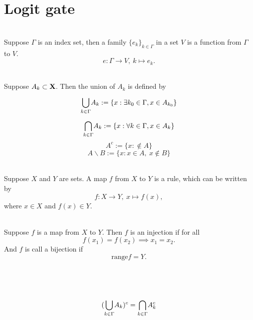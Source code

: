\documentclass[12pt]{book}
\begin{document}
\section{Logit gate}


\begin{definition}[Family] \ \\
Suppose $\Gamma$ is an index set, then a family $\{e_k\}_{k\in \Gamma}$ in a set $V$ is a function from $\Gamma$ to $V$.
$$
e : \Gamma \to V,\ k\mapsto e_k.
$$
\end{definition}

\begin{definition} \ \\
 Suppose $A_k \subset \mathbf{X}$. Then the union of $A_k$ is defined by 
 $$
 {\bigcup_{k\in\Gamma}^{}} A_k := \{ x: \exists k_0 \in \Gamma, x\in A_{k_0}\}
 $$
 $$
 {\bigcap_{k\in\Gamma}^{}} A_k := \{ x: \forall k \in \Gamma, x\in A_{k}\}
 $$
 $$
 A^c := \{x: \notin A\}
 $$
 $$
 A \backslash B := \{x: x\in A,\ x \notin B \}
 $$
\end{definition}

\begin{definition}[Map] \ \\
Suppose $X$ and $Y$ are sets. A map $f$ from $X$ to $Y$ is a rule, which can be written by
$$
f: X \to Y,\ x \mapsto f(x),
$$
where $x \in X$ and $f(x) \in Y$.
\end{definition}

\begin{definition} \ \\
Suppose $f$ is a map from $X$ to $Y$. Then $f$ is an injection if for all 
$$
f(x_1) = f(x_2) \implies x_1=x_2.
$$
And $f$ is call a bijection if 
$$
\mathrm{range} f = Y.
$$
\end{definition}


\begin{definition}
	
\end{definition}





\begin{definition} \ \\
\end{definition}








\begin{theorem}[De moivre] \ \\
$$
({\bigcup_{k\in\Gamma}^{}} A_k)^c =  {\bigcap_{k\in\Gamma}^{}} A_k^c
$$
\end{theorem}
\end{document}
